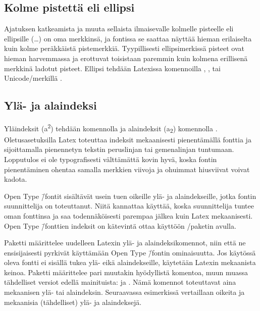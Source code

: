 
\subsection{Kolme pistettä eli ellipsi}

Ajatuksen katkeamista ja muuta sellaista ilmaisevalle kolmelle pisteelle
eli ellipsille (\ldots) on oma merkkinsä, ja fontissa se saattaa näyttää
hieman erilaiselta kuin kolme peräkkäistä pistemerkkiä. Tyypillisesti
ellipsimerkissä pisteet ovat hieman harvemmassa ja erottuvat toisistaan
paremmin kuin kolmena erillisenä merkkinä ladotut pisteet. Ellipsi
tehdään Latexissa komennoilla , ,
 tai Unicode\-/merkillä .

\subsection{Ylä- ja alaindeksi}

Yläindeksit (a\textsuperscript{2}) tehdään komennolla  ja alaindeksit (a\textsubscript{2}) komennolla
. Oletus\-asetuksilla Latex toteuttaa
indeksit mekaanisesti pienentämällä fonttia ja sijoittamalla pienennetyn
tekstin peruslinjan tai gemenalinjan tuntumaan. Lopputulos ei ole
typografisesti välttämättä kovin hyvä, koska fontin pienentäminen
ohentaa samalla merkkien viivoja ja ohuimmat hiusviivat voivat kadota.

Open Type \=/fontit sisältävät usein tuen oikeille ylä- ja
alaindekseille, jotka fontin suunnittelija on toteuttanut. Niitä
kannattaa käyttää, koska suunnittelija tuntee oman fonttinsa ja saa
todennäköisesti parempaa jälkea kuin Latex mekaanisesti. Open Type
\=/fonttien indeksit on kätevintä ottaa käyttöön
\-/paketin avulla.

\begin{koodilohkosis}
  \usepackage{realscripts}
\end{koodilohkosis}

Paketti  määrittelee uudelleen Latexin ylä- ja
alaindeksikomennot, niin että ne ensisijaisesti pyrkivät käyttämään Open
Type \=/fontin ominaisuutta. Jos käytössä oleva fontti ei sisällä tukea
ylä- eikä alaindekseille, käytetään Latexin mekaanista keinoa. Paketti
määrittelee pari muutakin hyödyllistä komentoa, muun muassa tähdelliset
versiot edellä mainituista:  ja
. Nämä komennot toteuttavat aina
mekaanisen ylä- tai alaindeksin. Seuraavassa esimerkissä vertaillaan
oikeita ja mekaanisia (tähdelliset) ylä- ja alaindeksejä.

